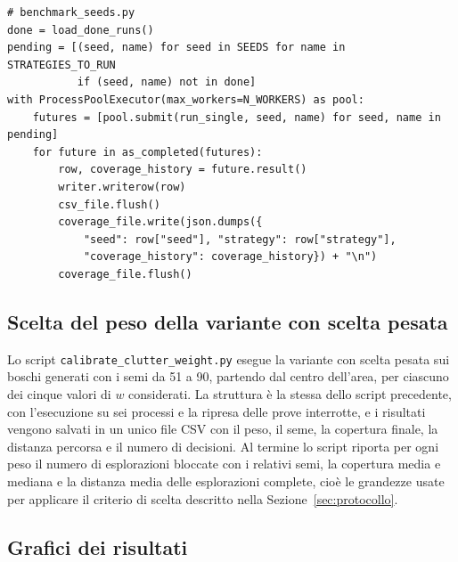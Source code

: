 \begin{lstlisting}[float=!htb, label=lst:benchmark, caption={Ripresa, esecuzione in parallelo e salvataggio dei risultati nelle prove sui 50 boschi.}]
# benchmark_seeds.py
done = load_done_runs()
pending = [(seed, name) for seed in SEEDS for name in STRATEGIES_TO_RUN
           if (seed, name) not in done]
with ProcessPoolExecutor(max_workers=N_WORKERS) as pool:
    futures = [pool.submit(run_single, seed, name) for seed, name in pending]
    for future in as_completed(futures):
        row, coverage_history = future.result()
        writer.writerow(row)
        csv_file.flush()
        coverage_file.write(json.dumps({
            "seed": row["seed"], "strategy": row["strategy"],
            "coverage_history": coverage_history}) + "\n")
        coverage_file.flush()
\end{lstlisting}

\subsection{Scelta del peso della variante con scelta pesata}
\label{sec:script_peso}

Lo script \texttt{calibrate\_clutter\_weight.py} esegue la variante con scelta pesata sui boschi generati con i semi da 51 a 90, partendo dal centro dell'area, per ciascuno dei cinque valori di $w$ considerati. La struttura è la stessa dello script precedente, con l'esecuzione su sei processi e la ripresa delle prove interrotte, e i risultati vengono salvati in un unico file CSV con il peso, il seme, la copertura finale, la distanza percorsa e il numero di decisioni. Al termine lo script riporta per ogni peso il numero di esplorazioni bloccate con i relativi semi, la copertura media e mediana e la distanza media delle esplorazioni complete, cioè le grandezze usate per applicare il criterio di scelta descritto nella Sezione~\ref{sec:protocollo}.

\subsection{Grafici dei risultati}
\label{sec:script_grafici}

